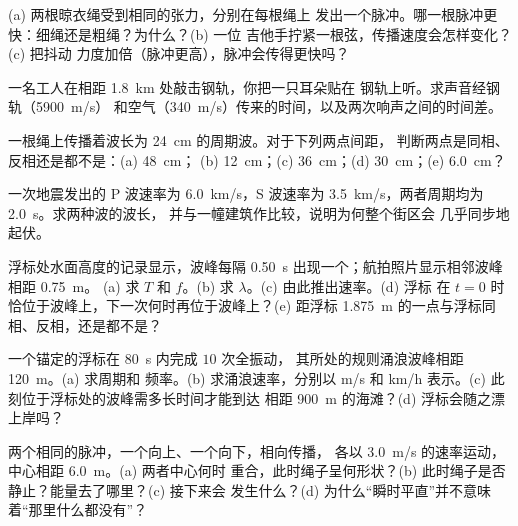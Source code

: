 \begin{exercise}[$\star\star$]\label{exo:g12:mechanical-waves:8}
(a) 两根晾衣绳受到相同的张力，分别在每根绳上
发出一个脉冲。哪一根脉冲更快：细绳还是粗绳？为什么？(b) 一位
吉他手拧紧一根弦，传播速度会怎样变化？(c) 把抖动
力度加倍（脉冲更高），脉冲会传得更快吗？
\end{exercise}

\begin{exercise}[$\star\star$]\label{exo:g12:mechanical-waves:9}
一名工人在相距 \qty{1.8}{km} 处敲击钢轨，你把一只耳朵贴在
钢轨上听。求声音经钢轨（\qty{5900}{m/s}）
和空气（\qty{340}{m/s}）传来的时间，以及两次响声之间的时间差。
\end{exercise}

\begin{exercise}[$\star\star$]\label{exo:g12:mechanical-waves:10}
一根绳上传播着波长为 \qty{24}{cm} 的周期波。对于下列两点间距，
判断两点是同相、反相还是都不是：(a) \qty{48}{cm}；
(b) \qty{12}{cm}；(c) \qty{36}{cm}；(d) \qty{30}{cm}；(e) \qty{6.0}{cm}？
\end{exercise}

\begin{exercise}[$\star\star$]\label{exo:g12:mechanical-waves:11}
一次地震发出的 P 波速率为 \qty{6.0}{km/s}，S 波速率为
\qty{3.5}{km/s}，两者周期均为 \qty{2.0}{s}。求两种波的波长，
并与一幢建筑作比较，说明为何整个街区会
几乎同步地起伏。
\end{exercise}

\begin{exercise}[$\star\star\star$]\label{exo:g12:mechanical-waves:12}
浮标处水面高度的记录显示，波峰每隔
\qty{0.50}{s} 出现一个；航拍照片显示相邻波峰相距 \qty{0.75}{m}。
(a) 求 $T$ 和 $f$。(b) 求 $\lambda$。(c) 由此推出速率。(d) 浮标
在 $t = 0$ 时恰位于波峰上，下一次何时再位于波峰上？(e) 距浮标 \qty{1.875}{m}
的一点与浮标同相、反相，还是都不是？
\end{exercise}

\begin{exercise}[$\star\star\star$]\label{exo:g12:mechanical-waves:13}
一个锚定的浮标在 \qty{80}{s} 内完成 $10$ 次全振动，
其所处的规则涌浪波峰相距 \qty{120}{m}。(a) 求周期和
频率。(b) 求涌浪速率，分别以 \unit{m/s} 和
\unit{km/h} 表示。(c) 此刻位于浮标处的波峰需多长时间才能到达
相距 \qty{900}{m} 的海滩？(d) 浮标会随之漂上岸吗？
\end{exercise}

\begin{exercise}[$\star\star\star$]\label{exo:g12:mechanical-waves:14}
两个相同的脉冲，一个向上、一个向下，相向传播，
各以 \qty{3.0}{m/s} 的速率运动，中心相距 \qty{6.0}{m}。(a) 两者中心何时
重合，此时绳子呈何形状？(b) 此时绳子是否
静止？能量去了哪里？(c) 接下来会
发生什么？(d) 为什么“瞬时平直”并不意味着“那里什么都没有”？
\end{exercise}

